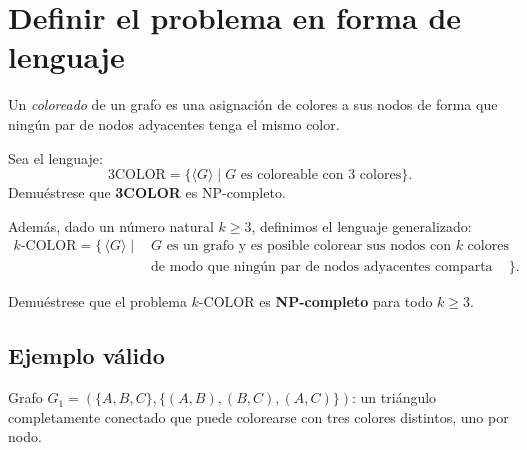 \documentclass[a4paper,12pt]{article}
\begin{document}
\newpage























\section{Definir el problema en forma de lenguaje}

Un \emph{coloreado} de un grafo es una asignación de colores a sus nodos de forma que ningún par de nodos adyacentes tenga el mismo color.

Sea el lenguaje:
\[
\text{3COLOR} = \{\langle G \rangle \mid G \text{ es coloreable con 3 colores} \}.
\]
Demuéstrese que \textbf{3COLOR} es NP-completo.

\vspace{1em}
Además, dado un número natural \(k \geq 3\), definimos el lenguaje generalizado:
\[
\begin{aligned}
k\text{-COLOR} = \big\{\, \langle G \rangle \;\big|\;\, &G \text{ es un grafo y es posible colorear sus nodos con } k \text{ colores} \\
&\text{de modo que ningún par de nodos adyacentes comparta color} \,\big\}.
\end{aligned}
\]

Demuéstrese que el problema \(k\text{-COLOR}\) es \textbf{NP-completo} para todo \(k \geq 3\).


\subsection{Ejemplo válido}
Grafo \( G_1 = (\{A, B, C\}, \{(A,B), (B,C), (A,C)\}) \): un triángulo completamente conectado que puede colorearse con tres colores distintos, uno por nodo.

\begin{center}
\end{center}
\end{document}
